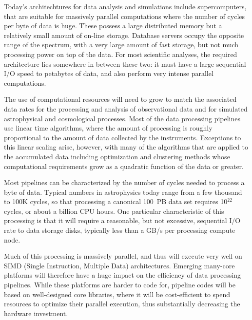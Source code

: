 Today's architechtures for data analysis and simulations include supercomputers, 
that are suitable for massively parallel computations where the number of 
cycles per byte of data is huge.  These possess a large distributed memory 
but a relatively small amount of on-line storage.
Database servers occupy the opposite range of the spectrum,
with a very large amount of fast storage, but not much processing
power on top of the data. For most scientific analyses, the required
architecture lies somewhere in between these two: it must have a large
sequential I/O speed to petabytes of data, and also perform very
intense parallel computations. 

The use of computational resources will need to grow to match the
associated data rates for the processing and analysis of observational
data and for simulated astrophysical and cosmological processes. Most
of the data processing pipelines use linear time algorithms, where the
amount of processing is roughly proportional to the amount of data
collected by the instruments.  Exceptions to this linear scaling arise, however,
with many of the algorithms that are applied to the accumulated data
including optimization and clustering methods whose computational requirements
grow as a quadratic function of the data or greater.

Most pipelines can be characterized by the number of cycles needed to
process a byte of data. Typical numbers in astrophysics today range
from a few thousand to 100K cycles, so that processing a canonical
100~PB data set requires 10$^{22}$ cycles, or about a billion CPU
hours. One particular characteristic of this processing is that it
will require a reasonable, but not excessive, sequential I/O rate to
data storage disks, typically less than a GB/s per processing compute
node.

Much of this processing is massively parallel, and thus will execute
very well on SIMD (Single Instruction, Multiple Data)
architectures. Emerging many-core platforms will therefore have a huge
impact on the efficiency of data processing pipelines. While these
platforms are harder to code for, pipeline codes will be based on
well-designed core libraries, where it will be cost-efficient to spend
resources to optimize their parallel execution, thus substantially
decreasing the hardware investment.

